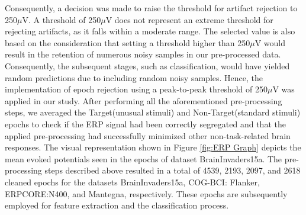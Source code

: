 Consequently, a decision was made to raise the threshold for artifact rejection to 250$\mu$V. A threshold of 250$\mu$V does not represent an extreme threshold for rejecting artifacts, as it falls within a moderate range. The selected value is also based on the consideration that setting a threshold higher than 250$\mu$V would result in the retention of numerous noisy samples in our pre-processed data. Consequently, the subsequent stages, such as classification, would have yielded random predictions due to including random noisy samples. Hence, the implementation of epoch rejection using a peak-to-peak threshold of 250$\mu$V was applied in our study. After performing all the aforementioned pre-processing steps, we averaged the Target(unusual stimuli) and Non-Target(standard stimuli) epochs to check if the ERP signal had been correctly segregated and that the applied pre-processing had successfully minimized other non-task-related brain responses. The visual representation shown in Figure \ref{fig:ERP Graph} depicts the mean evoked potentials seen in the epochs of dataset BrainInvaders15a. The pre-processing steps described above resulted in a total of 4539, 2193, 2097, and 2618 cleaned epochs for the datasets BrainInvaders15a, COG-BCI: Flanker, ERPCORE:N400, and Mantegna, respectively. These epochs are subsequently employed for feature extraction and the classification process. 
\smallskip

